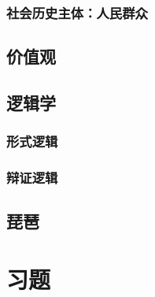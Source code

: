 \documentclass[12pt]{book}
\begin{document}
\section{社会历史主体：人民群众}



\chapter{价值观}



\chapter{逻辑学}



\section{形式逻辑}



\section{辩证逻辑}





\chapter{琵琶}\label{chapter:琵琶}




















\part{习题}
\end{document}
